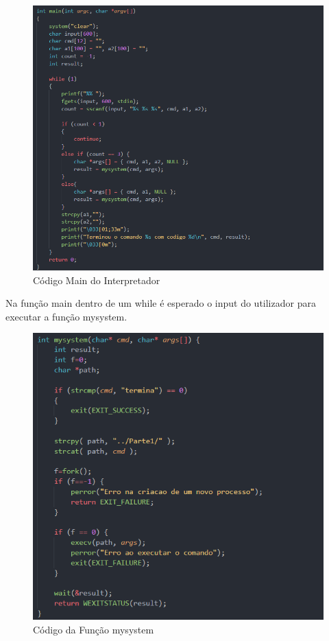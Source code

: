 \documentclass{article}
\begin{document}
	\newpage
	\begin{figure}[!htb]
		\centering
		\includegraphics[scale=0.7]{codigo_main}
		\caption{Código Main do Interpretador}
	\end{figure}

	\vspace{4 em}
	Na função main dentro de um while é esperado o input do utilizador para executar a função mysystem.
	
	\newpage
	
	\begin{figure}[!htb]
		\centering
		\includegraphics[scale=0.85]{codigo_mysystem}
		\caption{Código da Função mysystem}
	\end{figure}
\end{document}
